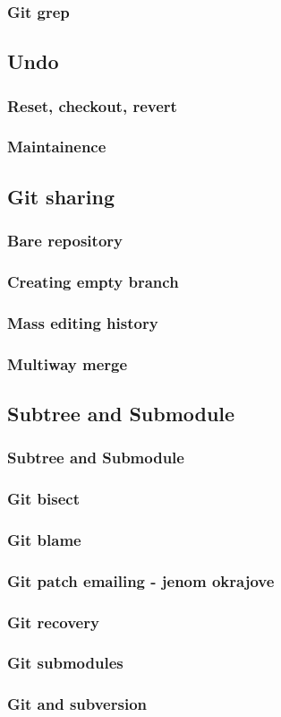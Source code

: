 \begin{frame}
	\frametitle{Git grep}
\end{frame}

\subsection{Undo}

\begin{frame}
	\frametitle{Reset, checkout, revert}
\end{frame}

\begin{frame}
	\frametitle{Maintainence}
\end{frame}

\subsection{Git sharing}

\begin{frame}
	\frametitle{Bare repository}
\end{frame}

\begin{frame}
	\frametitle{Creating empty branch}
\end{frame}

\begin{frame}
	\frametitle{Mass editing history}
\end{frame}

\begin{frame}
	\frametitle{Multiway merge}
\end{frame}

\subsection{Subtree and Submodule}

\begin{frame}
	\frametitle{Subtree and Submodule}
\end{frame}

\begin{frame}
	\frametitle{Git bisect}
\end{frame}

\begin{frame}
	\frametitle{Git blame}
\end{frame}

\begin{frame}
	\frametitle{Git patch emailing - jenom okrajove}
\end{frame}

\begin{frame}
	\frametitle{Git recovery}
\end{frame}

\begin{frame}
	\frametitle{Git submodules}
\end{frame}

\begin{frame}
	\frametitle{Git and subversion}
\end{frame}



